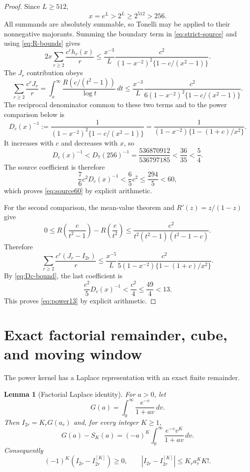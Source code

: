 \documentclass[11pt]{article}
\newtheorem{lemma}[theorem]{Lemma}
\theoremstyle{definition}
\theoremstyle{remark}
\begin{document}
\begin{proof}
Since $L\ge512$,
\begin{equation}
 x=e^L>2^L\ge2^{512}>256.
 \label{eq:bridge}
\end{equation}
All summands are absolutely summable, so Tonelli may be applied to their
nonnegative majorants.  Summing the boundary term in
\eqref{eq:strict-source} and using \eqref{eq:R-bounds} gives
\[
 2x\sum_{r\ge2}\frac{c^rh_r(x)}r
 \le\frac{x^{-3}}L
 \frac{c^2}{(1-x^{-2})^2\{1-c/(x^2-1)\}}.
\]
The $J_r$ contribution obeys
\[
 \sum_{r\ge2}\frac{c^rJ_r}r
 =\int_x^\infty\frac{R(c/(t^2-1))}{\log t}\,dt
 \le\frac{x^{-3}}L
 \frac{c^2}{6(1-x^{-2})^2\{1-c/(x^2-1)\}}.
\]
The reciprocal denominator common to these two terms and to the power
comparison below is
\begin{equation}
 D_c(x)^{-1}:=
 \frac1{(1-x^{-2})^2\{1-c/(x^2-1)\}}
 =\frac1{(1-x^{-2})\{1-(1+c)/x^2\}}.
 \label{eq:Dc}
\end{equation}
It increases with $c$ and decreases with $x$, so
\begin{equation}
 D_c(x)^{-1}<D_7(256)^{-1}
 =\frac{536870912}{536797185}<\frac{36}{35}<\frac54.
 \label{eq:Dc-bound}
\end{equation}
The source coefficient is therefore
\[
 \frac76c^2D_c(x)^{-1}<\frac65c^2
 \le\frac{294}{5}<60,
\]
which proves \eqref{eq:source60} by explicit arithmetic.

For the second comparison, the mean-value theorem and
$R'(z)=z/(1-z)$ give
\[
 0\le R\!\left(\frac{c}{t^2-1}\right)-R\!\left(\frac{c}{t^2}\right)
 \le\frac{c^2}{t^2(t^2-1)(t^2-1-c)}.
\]
Therefore
\[
 \sum_{r\ge2}\frac{c^r(J_r-I_{2r})}r
 \le\frac{x^{-5}}L
 \frac{c^2}{5(1-x^{-2})\{1-(1+c)/x^2\}}.
\]
By \eqref{eq:Dc-bound}, the last coefficient is
\[
 \frac{c^2}{5}D_c(x)^{-1}<\frac{c^2}{4}
 \le\frac{49}{4}<13.
\]
This proves \eqref{eq:power13} by explicit arithmetic.
\end{proof}

\section{Exact factorial remainder, cube, and moving window}

The power kernel has a Laplace representation with an exact finite
remainder.

\begin{lemma}[Factorial Laplace identity]
\label{lem:factorial}
For $a>0$, let
\[
 G(a)=\int_0^\infty\frac{e^{-v}}{1+av}\,dv.
\]
Then $I_{2r}=K_rG(a_r)$ and, for every integer $K\ge1$,
\begin{equation}
 G(a)-S_K(a)=(-a)^K
 \int_0^\infty\frac{e^{-v}v^K}{1+av}\,dv.
 \label{eq:exact-remainder}
\end{equation}
Consequently
\begin{equation}
 (-1)^K(I_{2r}-I_{2r}^{[K]})\ge0,\qquad
 |I_{2r}-I_{2r}^{[K]}|\le K_r a_r^K K!.
 \label{eq:factorial-bound}
\end{equation}
\end{lemma}
\end{document}
